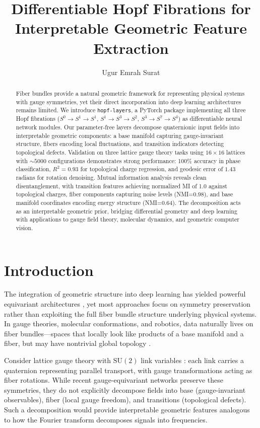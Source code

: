\documentclass[10pt,twocolumn]{article}
\title{Differentiable Hopf Fibrations for Interpretable Geometric Feature Extraction}
\author{Ugur Emrah Surat}
\date{}
\newcommand{\SU}{\mathrm{SU}}
\begin{document}
\maketitle

\begin{abstract}
Fiber bundles provide a natural geometric framework for representing physical systems with gauge symmetries, yet their direct incorporation into deep learning architectures remains limited. We introduce \texttt{hopf-layers}, a PyTorch package implementing all three Hopf fibrations ($S^0 \to S^1 \to S^1$, $S^1 \to S^3 \to S^2$, $S^3 \to S^7 \to S^4$) as differentiable neural network modules. Our parameter-free layers decompose quaternionic input fields into interpretable geometric components: a base manifold capturing gauge-invariant structure, fibers encoding local fluctuations, and transition indicators detecting topological defects. Validation on three lattice gauge theory tasks using $16 \times 16$ lattices with ${\sim}5000$ configurations demonstrates strong performance: 100\% accuracy in phase classification, $R^2=0.93$ for topological charge regression, and geodesic error of $1.43$ radians for rotation denoising. Mutual information analysis reveals clean disentanglement, with transition features achieving normalized MI of 1.0 against topological charges, fiber components capturing noise levels (NMI=0.98), and base manifold coordinates encoding energy structure (NMI=0.64). The decomposition acts as an interpretable geometric prior, bridging differential geometry and deep learning with applications to gauge field theory, molecular dynamics, and geometric computer vision.
\end{abstract}

\section{Introduction}

The integration of geometric structure into deep learning has yielded powerful equivariant architectures \citep{cohen2016group,bronstein2017geometric,weiler2018learning}, yet most approaches focus on symmetry preservation rather than exploiting the full fiber bundle structure underlying physical systems. In gauge theories, molecular conformations, and robotics, data naturally lives on fiber bundles---spaces that locally look like products of a base manifold and a fiber, but may have nontrivial global topology \citep{nakahara2003geometry,steenrod1951topology}.

Consider lattice gauge theory with $\SU(2)$ link variables \citep{wilson1974confinement,creutz1980monte}: each link carries a quaternion representing parallel transport, with gauge transformations acting as fiber rotations. While recent gauge-equivariant networks \citep{favoni2022lattice,boyda2021applications} preserve these symmetries, they do not explicitly decompose fields into base (gauge-invariant observables), fiber (local gauge freedom), and transitions (topological defects). Such a decomposition would provide interpretable geometric features analogous to how the Fourier transform decomposes signals into frequencies.
\end{document}
